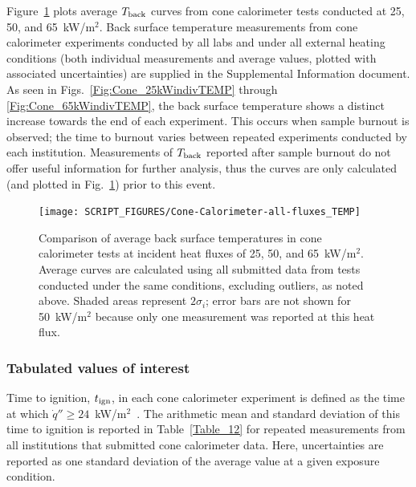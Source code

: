 \documentclass{book}
\begin{document}
Figure~\ref{Fig:Cone-Calorimeter-all-fluxes_TEMP} plots average $T_{\rm back}$ curves from cone calorimeter tests conducted at 25, 50, and 65~kW/m$^2$. Back surface temperature measurements from cone calorimeter experiments conducted by all labs and under all external heating conditions (both individual measurements and average values, plotted with associated uncertainties) are supplied in the Supplemental Information document. As seen in Figs.~\ref{Fig:Cone_25kWindivTEMP} through \ref{Fig:Cone_65kWindivTEMP}, the back surface temperature shows a distinct increase towards the end of each experiment. This occurs when sample burnout is observed; the time to burnout varies between repeated experiments conducted by each institution. Measurements of $T_{\rm back}$ reported after sample burnout do not offer useful information for further analysis, thus the curves are only calculated (and plotted in Fig.~\ref{Fig:Cone-Calorimeter-all-fluxes_TEMP}) prior to this event.

\newpage
\begin{figure}
  \centering
  \texttt{[image: SCRIPT\_FIGURES/Cone-Calorimeter-all-fluxes\_TEMP]}
  \caption{Comparison of average back surface temperatures in cone calorimeter tests at incident heat fluxes of 25, 50, and 65~kW/m$^2$. Average curves are calculated using all submitted data from tests conducted under the same conditions, excluding outliers, as noted above. Shaded areas represent $2\sigma_i$; error bars are not shown for 50~kW/m$^2$ because only one measurement was reported at this heat flux.}
  \label{Fig:Cone-Calorimeter-all-fluxes_TEMP}
\end{figure}


\subsubsection{Tabulated values of interest}

Time to ignition, $t_{\rm ign}$, in each cone calorimeter experiment is defined as the time at which $\dot{q}'' \ge 24$~kW/m$^2$~\cite{lyon2007criteria}. The arithmetic mean and standard deviation of this time to ignition is reported in Table~\ref{Table_12} for repeated measurements from all institutions that submitted cone calorimeter data. Here, uncertainties are reported as one standard deviation of the average value at a given exposure condition.
\end{document}
